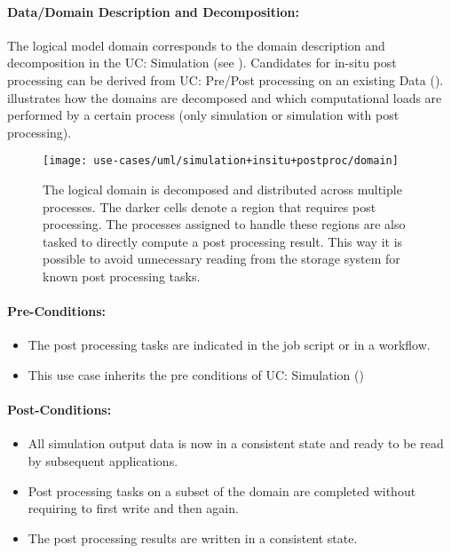 \paragraph{Data/Domain Description and Decomposition:}
The logical model domain corresponds to the domain description and decomposition in the UC: Simulation (see ).
Candidates for in-situ post processing can be derived from UC: Pre/Post processing on an existing Data ().
 illustrates how the domains are decomposed and which computational loads are performed by a certain process (only simulation or simulation with post processing).



\begin{figure}
	\centering
	\texttt{[image: use-cases/uml/simulation+insitu+postproc/domain]}
	\caption{The logical domain is decomposed and distributed across multiple processes. The darker cells denote a region that requires post processing. The processes assigned to handle these regions are also tasked to directly compute a post processing result. This way it is possible to avoid unnecessary reading from the storage system for known post processing tasks.}
	\label{fig:domain simulation+insitu+postproc}
\end{figure}




\paragraph{Pre-Conditions:}
\begin{itemize}
	\item The post processing tasks are indicated in the job script or in a workflow.
	\item This use case inherits the pre conditions of UC: Simulation ()
\end{itemize}


\paragraph{Post-Conditions:}
\begin{itemize}
	\item All simulation output data is now in a consistent state and ready to be read by subsequent applications.
	\item Post processing tasks on a subset of the domain are completed without requiring to first write and then again.
	\item The post processing results are written in a consistent state.
\end{itemize}



